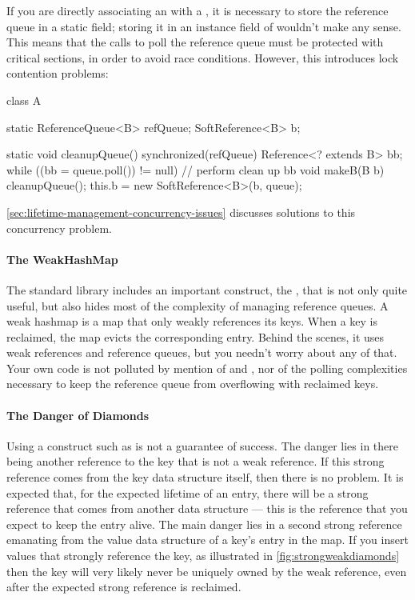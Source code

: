 If you are directly associating an  with a , it is 
necessary to store the reference queue in a static field; storing it in an
instance field of  wouldn't make any sense. This means that the calls
to poll the reference queue must be protected with critical sections, in order
to avoid race conditions. However, this introduces lock contention problems:
\begin{shortlisting}
class A {
   static ReferenceQueue<B> refQueue;
   SoftReference<B> b;
   
   static void cleanupQueue() {
      synchronized(refQueue) {
         Reference<? extends B> bb;
         while ((bb = queue.poll()) != null) {
            // perform clean up bb
         }
      }
   }
   void makeB(B b) {
      cleanupQueue();   
      this.b = new SoftReference<B>(b, queue);
   }
}
\end{shortlisting}
\autoref{sec:lifetime-management-concurrency-issues} discusses solutions to this
concurrency problem.

\paragraph{The WeakHashMap}
\label{sec:weakhashmap}

The standard library includes an important construct, the ,
that is not only quite useful, but also hides most of the complexity of managing
reference queues. A weak hashmap is a map that only weakly references its keys.
When a key is reclaimed, the map evicts the corresponding entry. Behind the
scenes, it uses weak references and reference queues, but you needn't worry about
any of that. Your own code is not polluted by mention of 
and , nor of the polling complexities necessary to keep the
reference queue from overflowing with reclaimed keys.

\paragraph{The Danger of Diamonds}

Using a construct such as  is not a guarantee of success. The
danger lies in there being another reference to the key that is not a weak
reference. If this strong reference comes from the key data structure itself,
then there is no problem. It is expected that, for the expected lifetime of an
entry, there will be a strong reference that comes from another data structure
--- this is the reference that you expect to keep the entry alive. The main
danger lies in a second strong reference emanating from the value data structure
of a key's entry in the map. If you insert values that strongly reference the
key, as illustrated in \autoref{fig:strongweakdiamonds} then the key will very
likely never be uniquely owned by the weak reference, even after the expected
strong reference is reclaimed.


